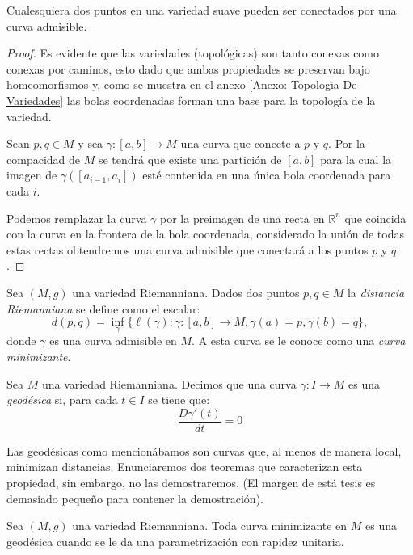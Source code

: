 \begin{lemma}
  Cualesquiera dos puntos en una variedad suave pueden ser conectados por una curva admisible.
\end{lemma}

\begin{proof}
  Es evidente que las variedades (topológicas) son tanto conexas como conexas por caminos, esto dado que ambas propiedades se preservan bajo homeomorfismos y, como se muestra en el anexo \ref{Anexo: Topologia De Variedades} las bolas coordenadas forman una base para la topología de la variedad.

  Sean $p, q \in M$ y sea $\gamma: [a,b] \to M$ una curva que conecte a $p$ y $q$. Por la compacidad de $M$ se tendrá que existe una partición de $[a,b]$ para la cual la imagen de $\gamma([a_{i-1}, a_i])$ esté contenida en una única bola coordenada para cada $i$.

  Podemos remplazar la curva $\gamma$ por la preimagen de una recta en $\mathbb{R}^{n}$ que coincida con la curva en la frontera de la bola coordenada, considerado la unión de todas estas rectas obtendremos una curva admisible que conectará a los puntos $p$ y $q$.
\end{proof}

\begin{definition}
  Sea $(M,g)$ una variedad Riemanniana. Dados dos puntos $p,q \in M$ la \textit{distancia Riemanniana} se define como el escalar:
  \[
    d(p,q) = \inf_{\gamma} \{\ell(\gamma): \gamma: [a,b] \to M, \gamma(a) = p, \gamma(b) = q\},
  \]
  donde $\gamma$ es una curva admisible en $M$. A esta curva se le conoce como una \textit{curva minimizante}.
\end{definition}

\begin{definition}[Geodésica]
  Sea $M$ una variedad Riemanniana. Decimos que una curva $\gamma: I \to M$ es una \textit{geodésica} si, para cada $t \in I$ se tiene que:
  \[
    \frac{D\gamma'(t)}{dt} = 0
  \]
\end{definition}
Las geodésicas como mencionábamos son curvas que, al menos de manera local, minimizan distancias. Enunciaremos dos teoremas que caracterizan esta propiedad, sin embargo, no las demostraremos. (El margen de está tesis es demasiado pequeño para contener la demostración).

\begin{theorem}
  Sea $(M,g)$ una variedad Riemanniana. Toda curva minimizante en $M$ es una geodésica cuando se le da una parametrización con rapidez unitaria.
\end{theorem}

